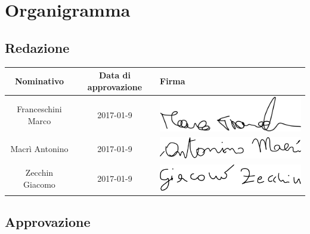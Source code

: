 \documentclass[../PianoProgetto.tex]{subfiles}
\begin{document}
\section{Organigramma}
	\subsection{Redazione}
		\begin{table}[h]
		\begin{tabularx}{\textwidth}{C C X}
			\toprule
			\textbf{Nominativo} & \textbf{Data di approvazione} & \textbf{Firma} \\
			\midrule
			Franceschini Marco & 2017-01-9 & \includegraphics[scale=0.4]{Firme/mfrances_firma} \\[1ex]
			\midrule
			Macrì Antonino & 2017-01-9 & \includegraphics[scale=0.3]{Firme/amacri_firma} \\[1ex]
			\midrule
			Zecchin Giacomo & 2017-01-9 & \includegraphics[scale=0.3]{Firme/gzecchin_firma} \\[1ex]
			\bottomrule
		\end{tabularx}
		
	\end{table}
	
	
	\subsection{Approvazione}
	
\end{document}
